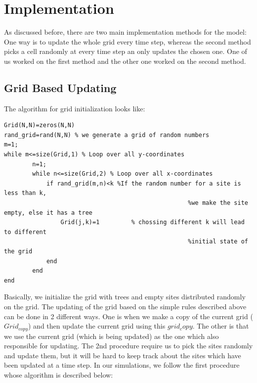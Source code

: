 \documentclass[11pt]{article}
\begin{document}
\section{Implementation}
As discussed before, there are two main implementation methods for the model: One way is to update the whole grid every time step, whereas the second method picks a cell randomly at every time step an only updates the chosen one. One of us worked on the first method and the other one worked on the second method.

\subsection{Grid Based Updating}
The algorithm for grid initialization looks like:
\begin{verbatim}
Grid(N,N)=zeros(N,N)
rand_grid=rand(N,N) % we generate a grid of random numbers
m=1;
while m<=size(Grid,1) % Loop over all y-coordinates
		n=1;
		while n<=size(Grid,2) % Loop over all x-coordinates
			if rand_grid(m,n)<k %If the random number for a site is less than k, 
													%we make the site empty, else it has a tree
				Grid(j,k)=1   		% chossing different k will lead to different 
													%initial state of the grid
			end
		end
end
\end{verbatim}
Basically, we initialize the grid with trees and empty sites distributed randomly on the grid.
The updating of the grid based on the simple rules described above can be done in 2 different ways. One is when we make a copy of the current grid ($Grid_{copy}$) and then update the current grid using this $grid_copy$. The other is that we use the current grid (which is being updated) as the one which also responsible for updating. The 2nd procedure require us to pick the sites randomly and update them, but it will be hard to keep track about the sites which have been updated at a time step. In our simulations, we follow the first procedure whose algorithm is described below: 
\end{document}
